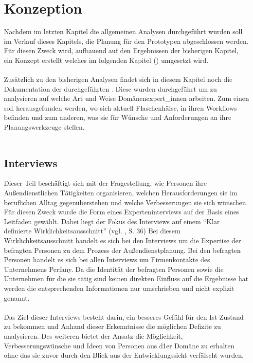 \documentclass[Bachelorarbeit.tex]{subfiles}
\begin{document}
\chapter{Konzeption}
\label{chap:entwicklung}
Nachdem im letzten Kapitel die allgemeinen Analysen durchgeführt wurden soll im Verlauf dieses Kapitels, die Planung für den Prototypen abgeschlossen werden.
Für diesen Zweck wird, aufbauend auf den Ergebnissen der bisherigen Kapitel, ein Konzept erstellt welches im folgenden Kapitel () umgesetzt wird. \\
\\
Zusätzlich zu den bisherigen Analysen findet sich in diesem Kapitel noch die Dokumentation der durchgeführten .
Diese  wurden durchgeführt um zu analysieren auf welche Art und Weise  Domänenexpert\_innen arbeiten.
Zum einen soll herausgefunden werden, wo sich aktuell Flaschenhälse, in ihren Workflows befinden und zum anderen, was sie für Wünsche und Anforderungen an ihre Planungswerkzeuge stellen.\\
\\

\section{Interviews}
\label{chap:analyse:sec:interviews}
Dieser Teil beschäftigt sich mit der Fragestellung, wie Personen ihre Außendienstlichen Tätigkeiten organisieren, welchen Herausforderungen sie im beruflichen Alltag gegenüberstehen und welche Verbesserungen sie sich wünschen. 
Für diesen Zweck wurde die Form eines Experteninterviews auf der Basis eines Leitfaden gewählt.
Dabei liegt der Fokus des Interviews auf einem "`Klar definierte Wirklichkeitsausschnitt"' (vgl. \cite{Mayer2006}, S. 36)
Bei diesem Wirklichkeitsausschnitt handelt es sich bei den Interviews um die Expertise der befragten Personen zu dem Prozess der Außendienstplanung.
Bei den befragten Personen handelt es sich bei allen Interviews um Firmenkontakte des Unternehmens Perfany.
Da die Identität der befragten Personen sowie die Unternehmen für die sie tätig sind keinen direkten Einfluss auf die Ergebnisse hat werden die entsprechenden Informationen nur umschrieben und nicht explizit genannt.\\
\\
Das Ziel dieser Interviews besteht darin, ein besseres Gefühl für den Ist-Zustand zu bekommen und Anhand dieser Erkenntnisse die möglichen Defizite zu analysieren.
Des weiteren bietet der Ansatz die Möglichkeit, Verbesserungswünsche und Ideen von Personen aus d1er Domäne zu erhalten ohne das sie zuvor durch den Blick aus der Entwicklungssicht verfälscht wurden.
\end{document}
